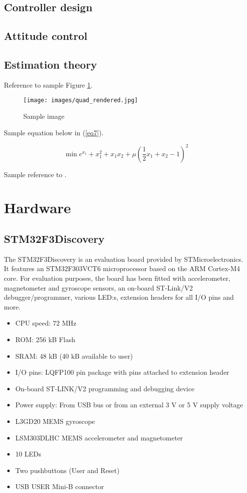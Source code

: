 \documentclass[a4paper]{article}
\begin{document}
	\subsection{Controller design}
	
	\subsection{Attitude control}
	
	\subsection{Estimation theory}

Reference to sample Figure \ref{fig:sampleimage}.

\begin{figure}[h]
    \centering
    \texttt{[image: images/quad\_rendered.jpg]}
    \caption{Sample image}
    \label{fig:sampleimage}
\end{figure}

Sample equation below in (\ref{eq7}).

\begin{equation}
\min e^{x_1} + x_{1}^2 + x_{1}x_{2} + \mu (\dfrac{1}{2}x_1 + x_2 - 1)^2
\label{eq7}
\end{equation}

Sample reference to \cite{stenberg}.

\section{Hardware}

\subsection{STM32F3Discovery}
The STM32F3Discovery is an evaluation board provided by STMicroelectronics. It features an STM32F303VCT6 microprocessor based on the ARM Cortex-M4 core. For evaluation purposes, the board has been fitted with accelerometer, magnetometer and gyroscope sensors, an on-board ST-Link/V2 debugger/programmer, various LED:s, extension headers for all I/O pins and more.

\begin{itemize}
  \item CPU speed: $72$ MHz
  \item ROM: 256 kB Flash
  \item SRAM: 48 kB (40 kB available to user)
  \item I/O pins: LQFP100 pin package with pins attached to extension header
  \item On-board ST-LINK/V2 programming and debugging device
  \item Power supply: From USB bus or from an external 3 V or 5 V supply voltage
  \item L3GD20 MEMS gyroscope
  \item LSM303DLHC MEMS accelerometer and magnetometer
  \item 10 LEDs
  \item Two pushbuttons (User and Reset)
  \item USB USER Mini-B connector
\end{itemize}
\end{document}

